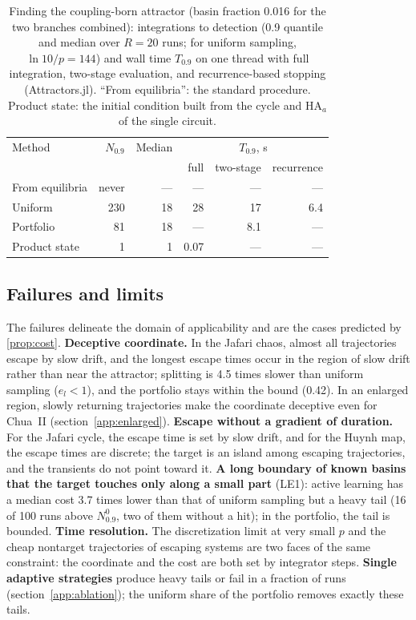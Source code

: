 \begin{table}[tbhp]
\caption{Finding the coupling-born attractor (basin fraction 0.016 for the two branches combined): integrations to detection (0.9 quantile and median over $R=20$ runs; for uniform sampling, $\ln10/p=144$) and wall time $T_{0.9}$ on one thread with full integration, two-stage evaluation, and recurrence-based stopping (Attractors.jl). ``From equilibria'': the standard procedure. Product state: the initial condition built from the cycle and HA$_a$ of the single circuit.}
\label{tab:newattr}
\centering\footnotesize
\begin{tabular}{lrrrrr}
\toprule
Method & $N_{0.9}$ & Median & \multicolumn{3}{c}{$T_{0.9}$, s} \\
 & & & full & two-stage & recurrence \\
\midrule
From equilibria & never & --- & --- & --- & --- \\
Uniform & 230 & 18 & 28 & 17 & 6.4 \\
Portfolio & 81 & 18 & --- & 8.1 & --- \\
Product state & 1 & 1 & 0.07 & --- & --- \\
\bottomrule
\end{tabular}
\end{table}

\subsection{Failures and limits}\label{sec:failures}

The failures delineate the domain of applicability and are the cases predicted by \cref{prop:cost}.
\textbf{Deceptive coordinate.} In the Jafari chaos, almost all trajectories escape by slow drift, and the longest escape times occur in the region of slow drift rather than near the attractor; splitting is 4.5 times slower than uniform sampling ($e_l<1$), and the portfolio stays within the bound (0.42). In an enlarged region, slowly returning trajectories make the coordinate deceptive even for Chua~II (section~\ref{app:enlarged}).
\textbf{Escape without a gradient of duration.} For the Jafari cycle, the escape time is set by slow drift, and for the Huynh map, the escape times are discrete; the target is an island among escaping trajectories, and the transients do not point toward it.
\textbf{A long boundary of known basins that the target touches only along a small part} (LE1): active learning has a median cost 3.7 times lower than that of uniform sampling but a heavy tail (16 of 100 runs above $N^0_{0.9}$, two of them without a hit); in the portfolio, the tail is bounded.
\textbf{Time resolution.} The discretization limit at very small $p$ and the cheap nontarget trajectories of escaping systems are two faces of the same constraint: the coordinate and the cost are both set by integrator steps.
\textbf{Single adaptive strategies} produce heavy tails or fail in a fraction of runs (section~\ref{app:ablation}); the uniform share of the portfolio removes exactly these tails.
